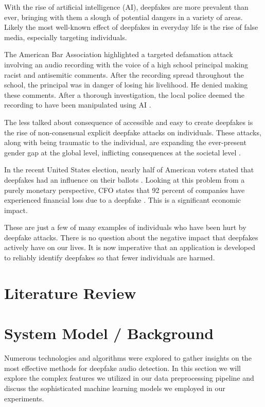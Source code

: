 \documentclass[conference]{IEEEtran}
\begin{document}
With the rise of artificial intelligence (AI), deepfakes are more prevalent than ever, bringing with them a slough of potential dangers in a variety of areas. Likely the most well-known effect of deepfakes in everyday life is the rise of false media, especially targeting individuals. 

The American Bar Association highlighted a targeted defamation attack involving an audio recording with the voice of a high school principal making racist and antisemitic comments. After the recording spread throughout the school, the principal was in danger of losing his livelihood. He denied making these comments. After a thorough investigation, the local police deemed the recording to have been manipulated using AI \cite{b5}. 

The less talked about consequence of accessible and easy to create deepfakes is the rise of non-consensual explicit deepfake attacks on individuals. These attacks, along with being traumatic to the individual, are expanding the ever-present gender gap at the global level, inflicting consequences at the societal level \cite{b3}.

In the recent United States election, nearly half of American voters stated that deepfakes had an influence on their ballots \cite{b1}. Looking at this problem from a purely monetary perspective, CFO states that 92 percent of companies have experienced financial loss due to a deepfake \cite{b4}. This is a significant economic impact. 

These are just a few of many examples of individuals who have been hurt by deepfake attacks. There is no question about the negative impact that deepfakes actively have on our lives. It is now imperative that an application is developed to reliably identify deepfakes so that fewer individuals are harmed. 

\section{Literature Review}

\section{System Model / Background}

Numerous technologies and algorithms were explored to gather insights on the most effective methods for deepfake audio detection. In this section we will explore the complex features we utilized in our data preprocessing pipeline and discuss the sophisticated machine learning models we employed in our experiments. 
\end{document}
